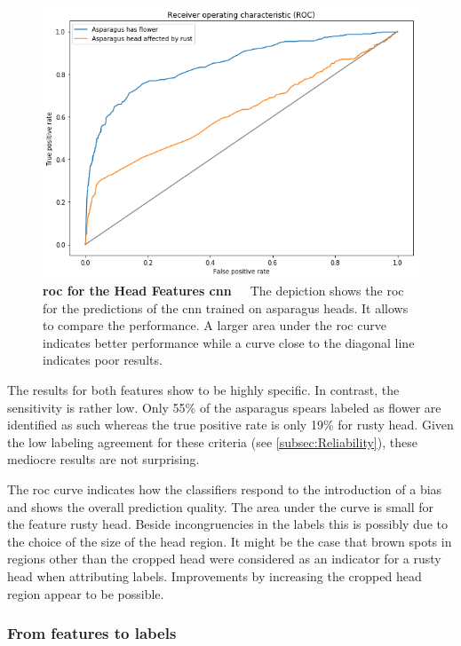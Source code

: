 \begin{figure}[!t]
	\centering
	\vspace{2cm}
	\includegraphics[scale=1.55]{Figures/chapter04/head_roc.png}
	\decoRule
	\caption[Head Features CNN ROC Curve]{\textbf{\acrshort{roc} for the Head Features \acrshort{cnn}}~~~The depiction shows the \acrfull{roc} for the predictions of the \acrshort{cnn} trained on asparagus heads. It allows to compare the performance. A larger area under the \acrshort{roc} curve indicates better performance while a curve close to the diagonal line indicates poor results.}
	\label{fig:HeadROC}
\end{figure}

\bigskip
The results for both features show to be highly specific. In contrast, the sensitivity is rather low. Only 55\% of the asparagus spears labeled as flower are identified as such whereas the true positive rate is only 19\% for rusty head. Given the low labeling agreement for these criteria (see \autoref{subsec:Reliability}), these mediocre results are not surprising.

The \acrshort{roc} curve indicates how the classifiers respond to the introduction of a bias and shows the overall prediction quality. The area under the curve is small for the feature rusty head. Beside incongruencies in the labels this is possibly due to the choice of the size of the head region. It might be the case that brown spots in regions other than the cropped head were considered as an indicator for a rusty head when attributing labels. Improvements by increasing the cropped head region appear to be possible.


\subsubsection{From features to labels}
\label{subsec:FeaturesToLabels}

